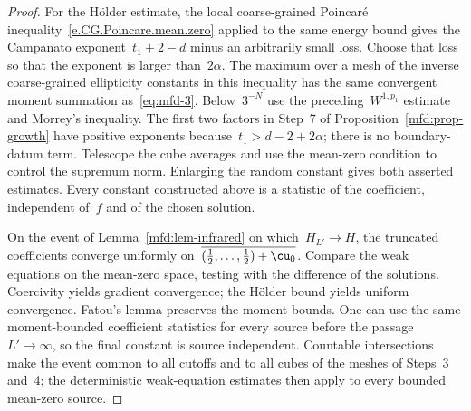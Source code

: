 \documentclass[11pt]{amsart}
\begin{document}
\begin{proof}
\smallskip

For the H\"older estimate, the local coarse-grained Poincar\'e inequality~\eqref{e.CG.Poincare.mean.zero} applied to the same energy bound gives the Campanato exponent~$t_1+2-d$ minus an arbitrarily small loss. Choose that loss so that the exponent is larger than~$2\alpha$. The maximum over a mesh of the inverse coarse-grained ellipticity constants in this inequality has the same convergent moment summation as~\eqref{eq:mfd-3}. Below~$3^{-N}$ use the preceding~$W^{1,p_1}$ estimate and Morrey's inequality. The first two factors in Step~7 of Proposition~\ref{mfd:prop-growth} have positive exponents because~$t_1>d-2+2\alpha$; there is no boundary-datum term. Telescope the cube averages and use the mean-zero condition to control the supremum norm. Enlarging the random constant gives both asserted estimates. Every constant constructed above is a statistic of the coefficient, independent of~$f$ and of the chosen solution.

\smallskip

On the event of Lemma~\ref{mfd:lem-infrared} on which~$H_{L'}\to H$, the truncated coefficients converge uniformly on~$\overline{(\tfrac12,\dots,\tfrac12)+\cu_0}$. Compare the weak equations on the mean-zero space, testing with the difference of the solutions. Coercivity yields gradient convergence; the H\"older bound yields uniform convergence. Fatou's lemma preserves the moment bounds. One can use the same moment-bounded coefficient statistics for every source before the passage~$L'\to\infty$, so the final constant is source independent. Countable intersections make the event common to all cutoffs and to all cubes of the meshes of Steps~3 and~4; the deterministic weak-equation estimates then apply to every bounded mean-zero source.

\smallskip


\end{proof}
\end{document}
